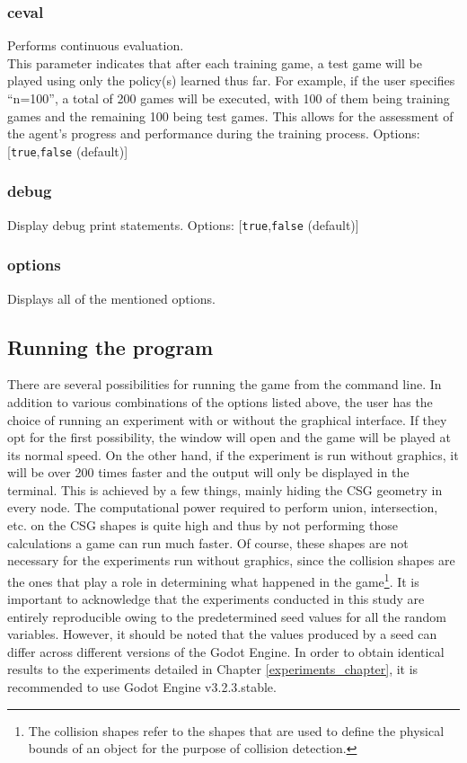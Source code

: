 \subsubsection*{ceval}
\label{opt:ceval}
Performs continuous evaluation.\\
This parameter indicates that after each training game, a test game will be played using only the policy(s) learned thus far. For example, if the user specifies ``n=100'', a total of 200 games will be executed, with 100 of them being training games and the remaining 100 being test games. This allows for the assessment of the agent's progress and performance during the training process. 
Options: [\texttt{true},\texttt{false} (default)]

\subsubsection*{debug}
\label{opt:debug}
Display debug print statements.
Options: [\texttt{true},\texttt{false} (default)]

\subsubsection*{options}
\label{opt:options}
Displays all of the mentioned options.


\subsection{Running the program}
There are several possibilities for running the game from the command line. In addition to various combinations of the options listed above, the user has the choice of running an experiment with or without the graphical interface. If they opt for the first possibility, the window will open and the game will be played at its normal speed. On the other hand, if the experiment is run without graphics, it will be over 200 times faster and the output will only be displayed in the terminal. This is achieved by a few things, mainly hiding the CSG geometry in every node. The computational power required to perform union, intersection, etc. on the CSG shapes is quite high and thus by not performing those calculations a game can run much faster. Of course, these shapes are not necessary for the experiments run without graphics, since the collision shapes are the ones that play a role in determining what happened in the game\footnote{The collision shapes refer to the shapes that are used to define the physical bounds of an object for the purpose of collision detection.}.
It is important to acknowledge that the experiments conducted in this study are entirely reproducible owing to the predetermined seed values for all the random variables. However, it should be noted that the values produced by a seed can differ across different versions of the Godot Engine. In order to obtain identical results to the experiments detailed in Chapter \ref{experiments_chapter}, it is recommended to use Godot Engine v3.2.3.stable.

